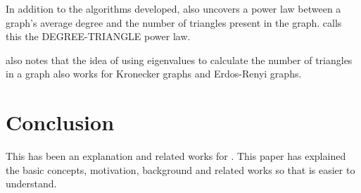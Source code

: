 \documentclass{acm_proc_article-sp}
\begin{document}
In addition to the algorithms developed, \cite{original} also uncovers a
power law between a graph's average degree and the number of triangles present
in the graph. \cite{original} calls this the DEGREE-TRIANGLE power law. 

\cite{original} also notes that the idea of using eigenvalues to calculate
the number of triangles in a
graph also works for Kronecker graphs and Erdos-Renyi graphs.

\section{Conclusion}
This has been an explanation and related works for \cite{original}. This paper
has explained the basic concepts, motivation, background and related works so
that \cite{original} is easier to understand.

%

%
%
\end{document}
